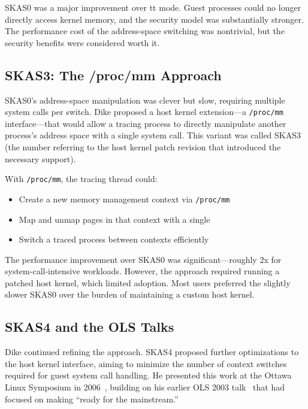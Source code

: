 \noindent
SKAS0 was a major improvement over tt mode.  Guest processes could no longer
directly access kernel memory, and the security model was substantially
stronger.  The performance cost of the address-space switching was nontrivial,
but the security benefits were considered worth it.

\subsection{SKAS3: The /proc/mm Approach}
\label{sec:history-skas3}

SKAS0's address-space manipulation was clever but slow, requiring multiple
system calls per switch.  Dike proposed a host kernel extension---a
\texttt{/proc/mm} interface---that would allow a tracing process to directly
manipulate another process's address space with a single system call.  This
variant was called SKAS3 (the number referring to the host kernel patch
revision that introduced the necessary support).

With \texttt{/proc/mm}, the tracing thread could:
\begin{itemize}[nosep]
  \item Create a new memory management context via \texttt{/proc/mm}
  \item Map and unmap pages in that context with a single 
  \item Switch a traced process between contexts efficiently
\end{itemize}

\noindent
The performance improvement over SKAS0 was significant---roughly 2x for
system-call-intensive workloads.  However, the approach required running a
patched host kernel, which limited adoption.  Most users preferred the
slightly slower SKAS0 over the burden of maintaining a custom host kernel.

\subsection{SKAS4 and the OLS Talks}
\label{sec:history-skas4}

Dike continued refining the approach.  SKAS4 proposed further optimizations
to the host kernel interface, aiming to minimize the number of context switches
required for guest system call handling.  He presented this work at the Ottawa
Linux Symposium in 2006~\cite{dike-ols2006}, building on his earlier OLS 2003
talk~\cite{dike-ols2003} that had focused on making \UML{} ``ready for the
mainstream.''

